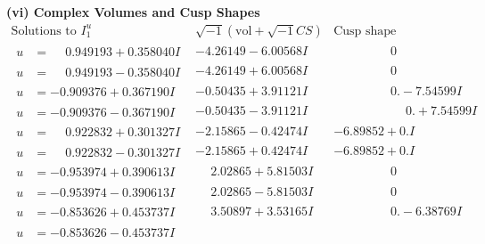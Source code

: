 \documentclass[1p]{elsarticle_modified}
\theoremstyle{definition}
\newcommand{\I}{\sqrt{-1}}
\begin{document}
\newpage\flushleft \textbf{(vi) Complex Volumes and Cusp Shapes}
$$\begin{array}{c|c|c}  
\text{Solutions to }I^u_{1}& \I (\text{vol} + \sqrt{-1}CS) & \text{Cusp shape}\\
 \hline 
\begin{aligned}
u &= \phantom{-}0.949193 + 0.358040 I\end{aligned}
 & -4.26149 - 6.00568 I & \phantom{-0.000000 } 0 \\ \hline\begin{aligned}
u &= \phantom{-}0.949193 - 0.358040 I\end{aligned}
 & -4.26149 + 6.00568 I & \phantom{-0.000000 } 0 \\ \hline\begin{aligned}
u &= -0.909376 + 0.367190 I\end{aligned}
 & -0.50435 + 3.91121 I & \phantom{-0.000000 } 0. - 7.54599 I \\ \hline\begin{aligned}
u &= -0.909376 - 0.367190 I\end{aligned}
 & -0.50435 - 3.91121 I & \phantom{-0.000000 -}0. + 7.54599 I \\ \hline\begin{aligned}
u &= \phantom{-}0.922832 + 0.301327 I\end{aligned}
 & -2.15865 - 0.42474 I & -6.89852 + 0. I\phantom{ +0.000000I} \\ \hline\begin{aligned}
u &= \phantom{-}0.922832 - 0.301327 I\end{aligned}
 & -2.15865 + 0.42474 I & -6.89852 + 0. I\phantom{ +0.000000I} \\ \hline\begin{aligned}
u &= -0.953974 + 0.390613 I\end{aligned}
 & \phantom{-}2.02865 + 5.81503 I & \phantom{-0.000000 } 0 \\ \hline\begin{aligned}
u &= -0.953974 - 0.390613 I\end{aligned}
 & \phantom{-}2.02865 - 5.81503 I & \phantom{-0.000000 } 0 \\ \hline\begin{aligned}
u &= -0.853626 + 0.453737 I\end{aligned}
 & \phantom{-}3.50897 + 3.53165 I & \phantom{-0.000000 } 0. - 6.38769 I \\ \hline\begin{aligned}
u &= -0.853626 - 0.453737 I\end{aligned}

\end{array}$$
\end{document}

